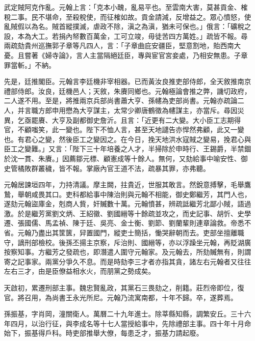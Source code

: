 \begin{pinyinscope}
武定賊阿克作亂。元翰上言：「克本小醜，亂易平也。至雲南大害，莫甚貢金、榷稅二事。民不堪命，至殺稅使，而征榷如故。貢金請減，反增益之。眾心憤怒，使亂賊假以為名。賊首縱撲滅，虐政不除，滇之為滇，猶未可保也。」俄言：「礦稅之設，本為大工。若捐內帑數百萬金，工可立竣，毋徒苦四方萬姓。」疏皆不報。尋兩疏劾貴州巡撫郭子章等凡四人，言：「子章曲庇安疆臣，堅意割地，貽西南大憂。且嘗著《婦寺論》，言人主當隔絕廷臣，專與宦官宮妾處，乃相安無患。子章罪當斬。」不納。

先是，廷推閣臣。元翰言李廷機非宰相器。已而黃汝良推吏部侍郎，全天敘推南京禮部侍郎。汝良，廷機邑人；天敘，朱賡同鄉也。元翰極論會推之弊，譏切政府，二人遂不用。至是，將推兩京兵部尚書蕭大亨、孫幰為吏部尚書。元翰亦疏論二人，并言職方郎申用懋為大亨謀主，太常少卿唐鶴徵為幰謀主，亦當斥。尋因災異，乞亟罷賡、大亨及副都御史詹沂。且言：「近更有二大變。大小臣工志期得官，不顧嗤笑，此一變也。陛下不恤人言，甚至天地譴告亦悍然弗顧，此又一變也。有君心之變，然後臣工之變因之。在今日，挽天地洪水寇賊之變易，挽君心與臣工之變難。」又言：「陛下三十年培養之人才，半掃除於申時行、王錫爵，半禁錮於沈一貫、朱賡。」因薦鄒元標、顧憲成等十餘人。無何，又劾給事中喻安性、御史管橘敗群叢穢，皆不報。掌廠內官王道不法，疏暴其罪，亦弗聽。

元翰居諫垣四年，力持清議。摩主闕，拄貴近，世服其敢言。然銳意搏擊，毛舉鷹鷙，舉朝咸畏其口。吏科都給事中陳治則與元翰不相能，御史鄭繼芳，其門人也，遂劾元翰盜庫金，剋商人貲，奸贓數十萬。元翰憤甚，辨疏詆繼芳北鄙小賊，語過激。於是繼芳黨劉文炳、王紹徽、劉國縉等十餘疏並攻之，而史記事、胡忻、史學遷、張國儒、馬孟禎、陳于廷、吳亮、金士衡、劉節、劉蘭輩則連章論救。帝悉不省。元翰乃盡出其筐篋，舁置國門，縱吏士簡括，慟哭辭朝而去。吏部坐擅離職守，謫刑部檢校。後孫丕揚主京察，斥治則、國縉等，亦以浮躁坐元翰，再貶湖廣按察知事。方繼芳之發疏也，即潛遣人圍守元翰家。及元翰去，所劾贓無有，則謂寄之記事家。兩黨分爭久不息。而是時劾李三才者亦指其貪，諸左右元翰者又往往左右三才，由是臣僚益相水火，而朋黨之勢成矣。

天啟初，累遷刑部主事。魏忠賢亂政，其黨石三畏劾之，削籍。莊烈帝即位，復官。將召用，為尚書王永光所尼。元翰乃流寓南都，十年不歸。卒，遂葬焉。

孫振基，字肖岡，潼關衛人。萬曆二十九年進士。除莘縣知縣，調繁安丘。三十六年四月，以治行征，與李成名等十七人當授給事中，先除禮部主事。四十年十月命始下，振基得戶科。時吏部推舉大僚，每患乏才，振基力請起廢。


\end{pinyinscope}
